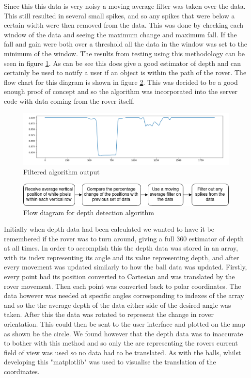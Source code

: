 \documentclass[10pt,twoside]{article}
\begin{document}
Since this this data is very noisy a moving average filter was taken over the data. This still resulted in several small spikes, and so any spikes that were below a certain width were then removed from the data. This was done by checking each window of the data and seeing the maximum change and maximum fall. If the fall and gain were both over a threshold all the data in the window was set to the minimum of the window. The results from testing using this methodology can be seen in figure \ref{fig:CommandFilteredDepth}. As can be see this does give a good estimator of depth and can certainly be used to notify a user if an object is within the path of the rover. The flow chart for this diagram is shown in figure \ref{fig:CommandDepthFlow}. This was decided to be a good enough proof of concept and so the algorithm was incorporated into the server code with data coming from the rover itself.

\begin{figure}[hbt]
    \centering
    \includegraphics[scale = 0.4]{CommandFiltered.png}
    \caption{Filtered algorithm output}
    \label{fig:CommandFilteredDepth}
\end{figure}


\begin{figure}[hbt]
    \centering
    \includegraphics[scale = 0.6]{CommandDepthFlow.png}
    \caption{Flow diagram for depth detection algorithm}
    \label{fig:CommandDepthFlow}
\end{figure}

Initially when depth data had been calculated we wanted to have it be remembered if the rover was to turn around, giving a full 360 estimator of depth at all times. In order to accomplish this the depth data was stored in an array, with its index representing its angle and its value representing depth, and after every movement was updated similarly to how the ball data was updated. Firstly, every point had its position converted to Cartesian and was translated by the rover movement. Then each point was converted back to polar coordinates. The data however was needed at specific angles corresponding to indexes of the array and so the the average depth of the data either side of the desired angle was taken. After this the data was rotated to represent the change in rover orientation. This could then be sent to the user interface and plotted on the map as shown be the circle. We found however that the depth data was to inaccurate to bother with this method and so only the arc representing the rovers current field of view was used so no data had to be translated. As with the balls, whilst developing this "matplotlib" was used to visualise the translation of the coordinates.
\end{document}
